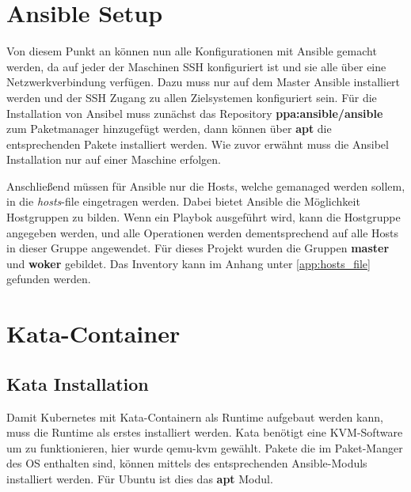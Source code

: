 \newpage

\section{Ansible Setup}
Von diesem Punkt an können nun alle Konfigurationen mit Ansible gemacht werden, da auf jeder der Maschinen \ac{SSH} konfiguriert ist und sie alle über eine Netzwerkverbindung verfügen.
Dazu muss nur auf dem Master Ansible installiert werden und der \ac{SSH} Zugang zu allen Zielsystemen konfiguriert sein. 
Für die Installation von Ansibel muss zunächst das Repository \textbf{ppa:ansible/ansible} zum Paketmanager hinzugefügt werden, dann können über \textbf{apt} die entsprechenden Pakete installiert werden.
Wie zuvor erwähnt muss die Ansibel Installation nur auf einer Maschine erfolgen.

Anschließend müssen für Ansible nur die Hosts, welche gemanaged werden sollem, in die \textit{hosts}-file eingetragen werden.
Dabei bietet Ansible die Möglichkeit Hostgruppen zu bilden. 
Wenn ein Playbok ausgeführt wird, kann die Hostgruppe angegeben werden, und alle Operationen werden dementsprechend auf alle Hosts in dieser Gruppe angewendet. 
Für dieses Projekt wurden die Gruppen \textbf{master} und \textbf{woker} gebildet.
Das Inventory kann im Anhang unter \ref{app:hosts_file} gefunden werden.

\section{Kata-Container}
\subsection{Kata Installation}

Damit Kubernetes mit Kata-Containern als Runtime aufgebaut werden kann, muss die Runtime als erstes installiert werden.
Kata benötigt eine \ac{KVM}-Software um zu funktionieren, hier wurde qemu-kvm gewählt.
Pakete die im Paket-Manger des \ac{OS} enthalten sind, können mittels des entsprechenden Ansible-Moduls installiert werden.
Für Ubuntu ist dies das \textbf{apt} Modul. 

